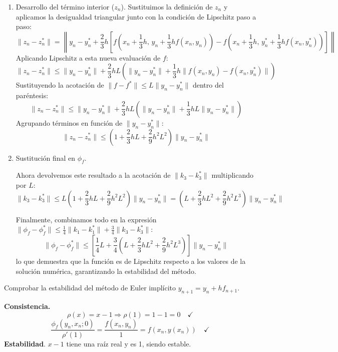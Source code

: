\begin{sol}[5]
\begin{enumerate}
\begin{enumerate}
Aplicando la condición de Lipschitz a $k_3$ respecto a su segundo argumento:
$$
\|k_3 - k_3^*\| \le L \|z_n - z_n^*\|
$$
\item Desarrollo del término interior ($z_n$).
Sustituimos la definición de $z_n$ y aplicamos la desigualdad triangular junto con la condición de Lipschitz paso a paso:
$$
\|z_n - z_n^*\| = \left\| y_n - y_n^* + \frac{2}{3}h \left[ f\left(x_n + \frac{1}{3}h, \, y_n + \frac{1}{3}h f(x_n, y_n)\right) - f\left(x_n + \frac{1}{3}h, \, y_n^* + \frac{1}{3}h f(x_n, y_n^*)\right) \right] \right\|
$$
Aplicando Lipschitz a esta nueva evaluación de $f$:
$$
\|z_n - z_n^*\| \le \|y_n - y_n^*\| + \frac{2}{3}h L \left( \|y_n - y_n^*\| + \frac{1}{3}h \|f(x_n, y_n) - f(x_n, y_n^*)\| \right)
$$
Sustituyendo la acotación de $\|f - f^*\| \le L \|y_n - y_n^*\|$ dentro del paréntesis:
$$
\|z_n - z_n^*\| \le \|y_n - y_n^*\| + \frac{2}{3}h L \left( \|y_n - y_n^*\| + \frac{1}{3}h L \|y_n - y_n^*\| \right)
$$
Agrupando términos en función de $\|y_n - y_n^*\|$:
$$
\|z_n - z_n^*\| \le \left( 1 + \frac{2}{3}h L + \frac{2}{9}h^2 L^2 \right) \|y_n - y_n^*\|
$$
\item Sustitución final en $\phi_f$.
 
Ahora devolvemos este resultado a la acotación de $\|k_3 - k_3^*\|$ multiplicando por $L$:
$$
\|k_3 - k_3^*\| \le L \left( 1 + \frac{2}{3}h L + \frac{2}{9}h^2 L^2 \right) \|y_n - y_n^*\| = \left( L + \frac{2}{3}h L^2 + \frac{2}{9}h^2 L^3 \right) \|y_n - y_n^*\|
$$

Finalmente, combinamos todo en la expresión $\|\phi_f - \phi_f^*\| \le \frac{1}{4}\|k_1 - k_1^*\| + \frac{3}{4}\|k_3 - k_3^*\|$:
$$
\|\phi_f - \phi_f^*\| \le \left[ \frac{1}{4} L + \frac{3}{4} \left( L + \frac{2}{3}h L^2 + \frac{2}{9}h^2 L^3 \right) \right] \|y_n - y_n^*\|
$$
lo que demuestra que la función es de Lipschitz respecto a los valores de la solución numérica, garantizando la estabilidad del método.
\end{enumerate}
\end{enumerate}
\end{sol}
\begin{ejer}
    Comprobar la estabilidad del m\'etodo de Euler impl\'icito $y_{n+1} = y_n + hf_{n+1}$.
\end{ejer}
\begin{sol} \textbf{Consistencia.}
        $$\rho(x) = x-1 \Rightarrow \rho(1) = 1-1=0 \quad \checkmark$$
        $$\frac{\phi_f(y_n,x_n;0)}{\rho'(1)} =\frac{f(x_n,y_n)}{1} = f(x_n, y(x_n)) \quad \checkmark$$
       \textbf{Estabilidad}. $x-1$ tiene una ra\'iz real y es 1, siendo estable.
\end{sol}




